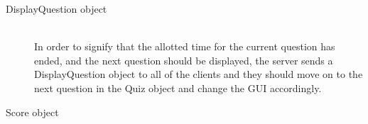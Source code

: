 \begin{description}
	\item[DisplayQuestion object]\hfill \\ In order to signify that the
		allotted time for the current question has ended, and the next question
		should be displayed, the server sends a DisplayQuestion object to all
		of the clients and they should move on to the next question in the Quiz
		object and change the GUI accordingly.

	\item[Score object]\hfill \\
\end{description}
